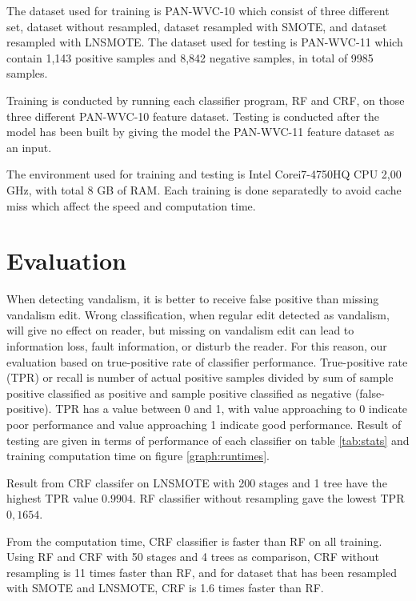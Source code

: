 \documentclass[conference,compsoc,a4paper,twocolumn,final]{IEEEtran}
\begin{document}


The dataset used for training is PAN-WVC-10 which consist of three different
set, dataset without resampled, dataset resampled with SMOTE, and dataset
resampled with LNSMOTE.
The dataset used for testing is PAN-WVC-11 which contain 1,143 positive
samples and 8,842 negative samples, in total of 9985 samples.

Training is conducted by running each classifier program, RF and CRF, on
those three different PAN-WVC-10 feature dataset.
Testing is conducted after the model has been built by giving the model the
PAN-WVC-11 feature dataset as an input.

The environment used for training and testing is Intel\textregistered
Core\texttrademark i7-4750HQ CPU 2,00 GHz, with total 8 GB of RAM.
Each training is done separatedly to avoid cache miss which affect the speed
and computation time.


\section{Evaluation}
\label{section:result_and_analysis}

When detecting vandalism, it is better to receive false positive than missing
vandalism edit.
Wrong classification, when regular edit detected as vandalism, will give no
effect on reader, but missing on vandalism edit can lead to information loss,
fault information, or disturb the reader.
For this reason, our evaluation based on true-positive rate of classifier
performance.
True-positive rate (TPR) or recall is number of actual positive samples divided
by sum of sample positive classified as positive and sample positive classified
as negative (false-positive).
TPR has a value between 0 and 1, with value approaching to 0 indicate poor
performance and value approaching 1 indicate good performance.
Result of testing are given in terms of performance of each classifier on table
\ref{tab:stats} and training computation time on figure \ref{graph:runtimes}.

Result from CRF classifer on LNSMOTE with 200 stages and 1 tree have the
highest TPR value $0.9904$.
RF classifier without resampling gave the lowest TPR $0,1654$.

From the computation time, CRF classifier is faster than RF on all training.
Using RF and CRF with 50 stages and 4 trees as comparison, CRF without
resampling is 11 times faster than RF, and for dataset that has been resampled
with SMOTE and LNSMOTE, CRF is 1.6 times faster than RF.
\end{document}
